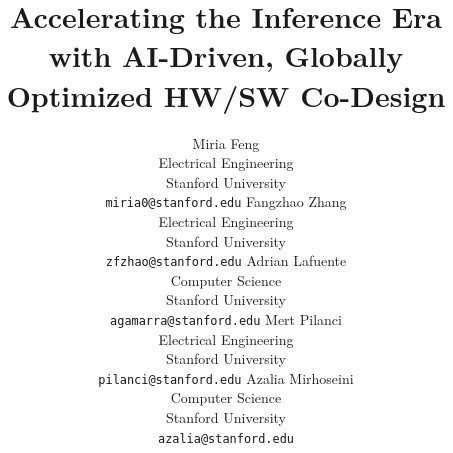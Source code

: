 \newcommand{\mnote}[1]{}
\renewcommand{\mnote}[1]{\textcolor{blue}{\textbf{[NOTE: #1]}}}

\newcommand{\ie}{\textit{i.e.}}
\newcommand{\eg}{\textit{e.g.}}
\newcommand{\acroletter}[1]{\textbf{\textsc{#1}}}
\newcommand{\etal}{\textit{et al.}}
\newcommand{\todo}[1]{\textcolor{red}{\textbf{[TODO: #1]}}}
\newcommand{\Tmax}{T^{\max}}
\newcommand{\Tmin}{T^{\min}}
\newcommand{\CGM}{C_{\text{GM}}}
\newcommand{\Vzero}{\textcolor{skyblue}{V0}}
\newcommand{\Vone}{\textcolor{skyblue}{V1}}
\DeclareMathOperator*{\argmin}{arg\,min}


\title{Accelerating the Inference Era with AI-Driven, Globally Optimized HW/SW Co-Design}

\author{%
    Miria Feng \\
    Electrical Engineering \\
    Stanford University \\
    \texttt{miria0@stanford.edu}
    \And
    Fangzhao Zhang \\
    Electrical Engineering \\
    Stanford University \\
    \texttt{zfzhao@stanford.edu} 
    \And
    Adrian Lafuente \\
    Computer Science \\
    Stanford University \\
    \texttt{agamarra@stanford.edu}
    \And
    Mert Pilanci \\
    Electrical Engineering \\
    Stanford University \\
    \texttt{pilanci@stanford.edu}
    \And
    Azalia Mirhoseini \\
    Computer Science \\
    Stanford University \\
    \texttt{azalia@stanford.edu}
}






